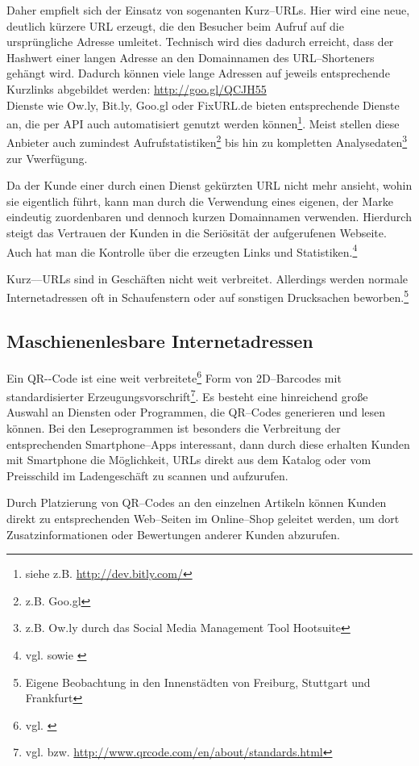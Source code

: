 Daher empfielt sich der Einsatz von sogenanten Kurz--URLs. Hier wird eine neue, deutlich kürzere \ac{URL} erzeugt, die den Besucher beim Aufruf auf die ursprüngliche Adresse umleitet. Technisch wird dies dadurch erreicht, dass der Hashwert einer langen Adresse an den Domainnamen des URL--Shorteners gehängt wird. Dadurch können viele lange Adressen auf jeweils
entsprechende Kurzlinks abgebildet werden: \url{http://goo.gl/QCJH55}\\
Dienste wie Ow.ly, Bit.ly, Goo.gl oder FixURL.de bieten entsprechende Dienste an, die per \ac{API} auch automatisiert genutzt werden können\footnote{siehe z.B. \url{http://dev.bitly.com/}}. Meist stellen diese Anbieter auch zumindest Aufrufstatistiken\footnote{z.B. Goo.gl} bis hin zu kompletten Analysedaten\footnote{z.B. Ow.ly durch das Social Media Management Tool Hootsuite} zur Vwerfügung.

Da der Kunde einer durch einen Dienst gekürzten \ac{URL} nicht mehr ansieht, wohin sie eigentlich führt, kann man durch die Verwendung eines eigenen, der Marke eindeutig zuordenbaren und dennoch kurzen Domainnamen verwenden. Hierdurch steigt das Vertrauen der Kunden in die Seriösität der aufgerufenen Webseite. Auch hat man die Kontrolle über die erzeugten Links und Statistiken.\footnote{vgl. \cite{webmag} sowie \cite{gillen}}

Kurz––URLs sind in Geschäften nicht weit verbreitet. Allerdings werden normale Internetadressen oft in Schaufenstern oder auf sonstigen Drucksachen beworben.\footnote{Eigene Beobachtung in den Innenstädten von Freiburg, Stuttgart und Frankfurt}

\subsection{Maschienenlesbare Internetadressen}

Ein \ac{QR--Code} ist eine weit verbreitete\footnote{vgl. \cite{statista:qr}} Form von 2D--Barcodes mit standardisierter Erzeugungsvorschrift\footnote{vgl. \cite{iso:qr} bzw. \url{http://www.qrcode.com/en/about/standards.html}}. Es besteht eine hinreichend große Auswahl an Diensten oder Programmen, die QR--Codes generieren und lesen können. Bei den Leseprogrammen ist besonders die Verbreitung der entsprechenden Smartphone--Apps interessant, dann durch diese erhalten Kunden mit Smartphone die Möglichkeit, \ac{URL}s direkt aus dem Katalog oder vom Preisschild im Ladengeschäft zu scannen und aufzurufen. 

Durch Platzierung von QR--Codes an den einzelnen Artikeln können Kunden direkt zu entsprechenden Web--Seiten im Online--Shop geleitet werden, um dort Zusatzinformationen oder Bewertungen anderer Kunden abzurufen. 

